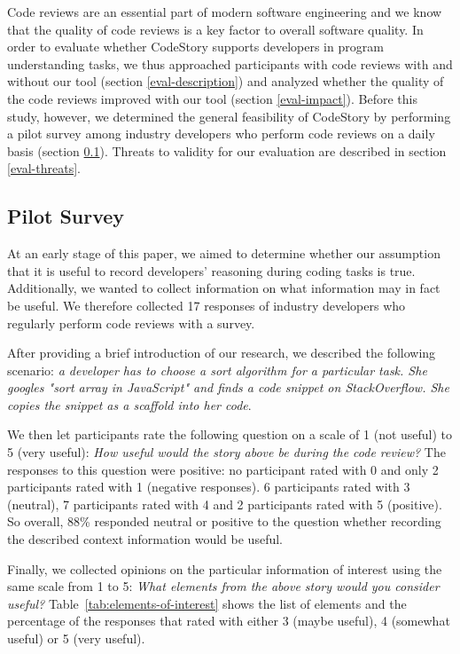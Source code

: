 \documentclass[../manifest.tex]{subfiles}
\begin{document}
Code reviews are an essential part of modern software engineering and we know that the quality of code reviews is a key factor to overall software quality. In order to evaluate whether CodeStory supports developers in program understanding tasks, we thus approached participants with code reviews with and without our tool (section \ref{eval-description}) and analyzed whether the quality of the code reviews improved with our tool (section \ref{eval-impact}). Before this study, however, we determined the general feasibility of CodeStory by performing a pilot survey among industry developers who perform code reviews on a daily basis (section \ref{eval-survey}). Threats to validity for our evaluation are described in section \ref{eval-threats}.

\subsection{Pilot Survey} \label{eval-survey}

At an early stage of this paper, we aimed to determine whether our assumption that it is useful to record developers' reasoning during coding tasks is true. Additionally, we wanted to collect information on what information may in fact be useful. We therefore collected 17 responses of industry developers who regularly perform code reviews with a survey. 

After providing a brief introduction of our research, we described the following scenario: \textit{a developer has to choose a sort algorithm for a particular task. She googles "sort array in JavaScript" and finds a code snippet on StackOverflow. She copies the snippet as a scaffold into her code}.

We then let participants rate the following question on a scale of 1 (not useful) to 5 (very useful): \textit{How useful would the story above be during the code review?} The responses to this question were positive: no participant rated with 0 and only 2 participants rated with 1 (negative responses). 6 participants rated with 3 (neutral), 7 participants rated with 4 and 2 participants rated with 5 (positive). So overall, 88\% responded neutral or positive to the question whether recording the described context information would be useful.

Finally, we collected opinions on the particular information of interest using the same scale from 1 to 5: \textit{What elements from the above story would you consider useful?} Table~\ref{tab:elements-of-interest} shows the list of elements and the percentage of the responses that rated with either 3 (maybe useful), 4 (somewhat useful) or 5 (very useful).
\end{document}
